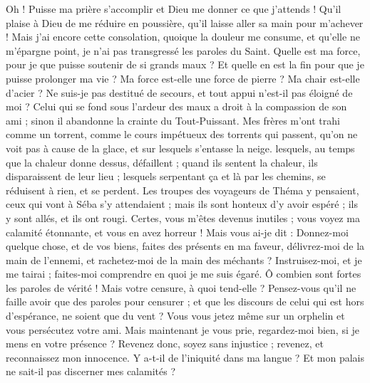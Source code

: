 \begin{multicols}{2}
Oh ! Puisse ma prière s'accomplir et Dieu me donner ce que j'attends !
Qu'il plaise à Dieu de me réduire en poussière, qu'il laisse aller sa main pour m'achever !
Mais j'ai encore cette consolation, quoique la douleur me consume, et qu'elle ne m'épargne point, je n'ai pas transgressé les paroles du Saint.
Quelle est ma force, pour je que puisse soutenir de si grands maux ? Et quelle en est la fin pour que je puisse prolonger ma vie ? 
Ma force est-elle une force de pierre ? Ma chair est-elle d'acier ?
Ne suis-je pas destitué de secours, et tout appui n'est-il pas éloigné de moi ?
Celui qui se fond sous l'ardeur des maux a droit à la compassion de son ami ; sinon il abandonne la crainte du Tout-Puissant.
Mes frères m'ont trahi comme un torrent, comme le cours impétueux des torrents qui passent,
qu'on ne voit pas à cause de la glace, et sur lesquels s'entasse la neige.
lesquels, au temps que la chaleur donne dessus, défaillent ; quand ils sentent la chaleur, ils disparaissent de leur lieu ;
lesquels serpentant ça et là par les chemins, se réduisent à rien, et se perdent.
Les troupes des voyageurs de Théma y pensaient, ceux qui vont à Séba s'y attendaient ;
mais ils sont honteux d'y avoir espéré ; ils y sont allés, et ils ont rougi.
Certes, vous m'êtes devenus inutiles ; vous voyez ma calamité étonnante, et vous en avez horreur !
Mais vous ai-je dit : Donnez-moi quelque chose, et de vos biens, faites des présents en ma faveur,
délivrez-moi de la main de l'ennemi, et rachetez-moi de la main des méchants ?
Instruisez-moi, et je me tairai ; faites-moi comprendre en quoi je me suis égaré.
Ô combien sont fortes les paroles de vérité ! Mais votre censure, à quoi tend-elle ?
Pensez-vous qu'il ne faille avoir que des paroles pour censurer ; et que les discours de celui qui est hors d'espérance, ne soient que du vent ?
Vous vous jetez même sur un orphelin et vous persécutez votre ami.
Mais maintenant je vous prie, regardez-moi bien, si je mens en votre présence ?
Revenez donc, soyez sans injustice ; revenez, et reconnaissez mon innocence.
Y a-t-il de l'iniquité dans ma langue ? Et mon palais ne sait-il pas discerner mes calamités ? 

\end{multicols}
